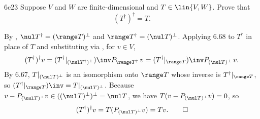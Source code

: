 \begin{exercise}{6c23}
    Suppose $V$ and $W$ are finite-dimensional and $T \in \lin{V, W}$.
    Prove that
    \[
        (T^\dagger)^\dagger = T.
    \]
\end{exercise}

\begin{sol}
    By , $\nul T^\dagger = (\range T)^\perp$ and $\range T^\dagger = (\nul T)^\perp$.
    Applying 6.68 to $T^\dagger$ in place of $T$ and substituting via , for $v \in V$,
    \[
        (T^\dagger)^\dagger v = (T^\dagger|_{(\nul T^\dagger)^\perp})\inv P_{\range T^\dagger}\, v = (T^\dagger|_{\range T})\inv P_{(\nul T)^\perp}\, v.
    \]
    By 6.67, $T|_{(\nul T)^\perp}$ is an isomorphism onto $\range T$ whose inverse is $T^\dagger|_{\range T}$, so $(T^\dagger|_{\range T})\inv = T|_{(\nul T)^\perp}$.
    Because $v - P_{(\nul T)^\perp} v \in ((\nul T)^\perp)^\perp = \nul T$, we have $T(v - P_{(\nul T)^\perp} v) = 0$, so
    \[
        (T^\dagger)^\dagger v = T(P_{(\nul T)^\perp} v) = Tv. \qedhere
    \]
\end{sol}
